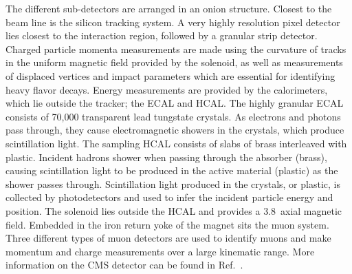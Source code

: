 %
The different sub-detectors are arranged in an onion structure.
%
Closest to the beam line is the silicon tracking system.
A very highly resolution pixel detector lies closest to the interaction region, followed by a granular strip detector.
Charged particle momenta measurements are made using the curvature of tracks in the uniform magnetic field provided by the solenoid, as well as measurements of displaced vertices and impact parameters which are essential for identifying heavy flavor decays. 
%
Energy measurements are provided by the calorimeters, which lie outside the tracker; the \ac{ECAL} and \ac{HCAL}. 
The highly granular \ac{ECAL} consists of 70,000 transparent lead tungstate crystals. 
As electrons and photons pass through, they cause electromagnetic showers in the crystals, which produce scintillation light.
%
The sampling \ac{HCAL} consists of slabs of brass interleaved with plastic. 
Incident hadrons shower when passing through the absorber (brass), causing scintillation light to be produced in the active material (plastic) as the shower passes through.
%
Scintillation light produced in the crystals, or plastic, is collected by photodetectors and used to infer the incident particle energy and position.
%
The solenoid lies outside the \ac{HCAL} and provides a 3.8~\T axial magnetic field.
%
Embedded in the iron return yoke of the magnet sits the muon system. 
Three different types of muon detectors are used to identify muons and make momentum and charge measurements over a large kinematic range.
%
More information on the CMS detector can be found in Ref.~\cite{Chatrchyan:2008aa}.

%

